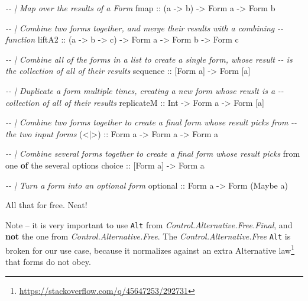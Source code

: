 \documentclass[]{article}
\newenvironment{Shaded}{}{}
\newcommand{\CommentTok}[1]{\textcolor[rgb]{0.38,0.63,0.69}{\textit{#1}}}
\newcommand{\DataTypeTok}[1]{\textcolor[rgb]{0.56,0.13,0.00}{#1}}
\newcommand{\FunctionTok}[1]{\textcolor[rgb]{0.02,0.16,0.49}{#1}}
\newcommand{\KeywordTok}[1]{\textcolor[rgb]{0.00,0.44,0.13}{\textbf{#1}}}
\newcommand{\NormalTok}[1]{#1}
\newcommand{\OtherTok}[1]{\textcolor[rgb]{0.00,0.44,0.13}{#1}}
\renewcommand{\href}[2]{#2\footnote{\url{#1}}}
\begin{document}
\begin{Shaded}
\begin{Highlighting}[]
\CommentTok{{-}{-} | Map over the results of a Form}
\FunctionTok{fmap}\OtherTok{   ::}\NormalTok{ (a }\OtherTok{{-}>}\NormalTok{ b) }\OtherTok{{-}>} \DataTypeTok{Form}\NormalTok{ a }\OtherTok{{-}>} \DataTypeTok{Form}\NormalTok{ b}

\CommentTok{{-}{-} | Combine two forms together, and merge their results with a combining}
\CommentTok{{-}{-} function}
\OtherTok{liftA2 ::}\NormalTok{ (a }\OtherTok{{-}>}\NormalTok{ b }\OtherTok{{-}>}\NormalTok{ c) }\OtherTok{{-}>} \DataTypeTok{Form}\NormalTok{ a }\OtherTok{{-}>} \DataTypeTok{Form}\NormalTok{ b }\OtherTok{{-}>} \DataTypeTok{Form}\NormalTok{ c}

\CommentTok{{-}{-} | Combine all of the forms in a list to create a single form, whose result}
\CommentTok{{-}{-} is the collection of all of their results}
\FunctionTok{sequence}\OtherTok{ ::}\NormalTok{ [}\DataTypeTok{Form}\NormalTok{ a] }\OtherTok{{-}>} \DataTypeTok{Form}\NormalTok{ [a]}

\CommentTok{{-}{-} | Duplicate a form multiple times, creating a new form whose reuslt is a}
\CommentTok{{-}{-} collection of all of their results}
\OtherTok{replicateM ::} \DataTypeTok{Int} \OtherTok{{-}>} \DataTypeTok{Form}\NormalTok{ a }\OtherTok{{-}>} \DataTypeTok{Form}\NormalTok{ [a]}

\CommentTok{{-}{-} | Combine two forms together to create a final form whose result picks from}
\CommentTok{{-}{-} the two input forms}
\OtherTok{(<|>) ::} \DataTypeTok{Form}\NormalTok{ a }\OtherTok{{-}>} \DataTypeTok{Form}\NormalTok{ a }\OtherTok{{-}>} \DataTypeTok{Form}\NormalTok{ a}

\CommentTok{{-}{-} | Combine several forms together to create a final form whose result picks}
\NormalTok{from one }\KeywordTok{of}\NormalTok{ the several options}
\OtherTok{choice ::}\NormalTok{ [}\DataTypeTok{Form}\NormalTok{ a] }\OtherTok{{-}>} \DataTypeTok{Form}\NormalTok{ a}

\CommentTok{{-}{-} | Turn a form into an optional form}
\OtherTok{optional ::} \DataTypeTok{Form}\NormalTok{ a }\OtherTok{{-}>} \DataTypeTok{Form}\NormalTok{ (}\DataTypeTok{Maybe}\NormalTok{ a)}
\end{Highlighting}
\end{Shaded}

All that for free. Neat!

Note -- it is very important to use \texttt{Alt} from
\emph{Control.Alternative.Free.Final}, and \textbf{not} the one from
\emph{Control.Alternative.Free}. The \emph{Control.Alternative.Free}
\texttt{Alt} is broken for our use case, because it normalizes against
\href{https://stackoverflow.com/q/45647253/292731}{an extra Alternative law}
that forms do not obey.
\end{document}
